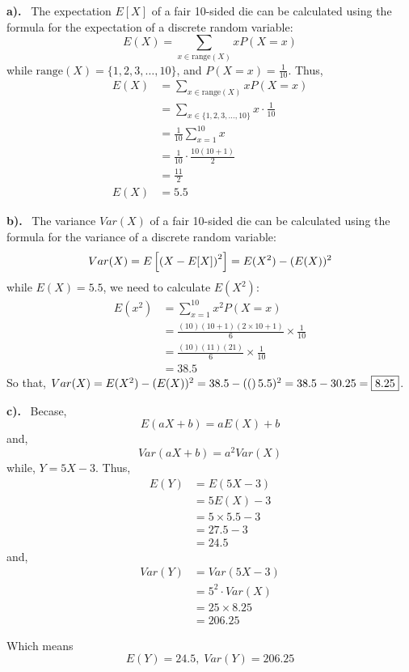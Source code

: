 \documentclass[a4paper, 10pt]{article}
\begin{document}
\begin{solution}
\par\noindent\textbf{a).} \, The expectation \( E[X] \) of a fair 10-sided die can be calculated
using the formula for the expectation of a discrete random variable:
\[
    E(X) = \sum_{x \in \text{range}(X)} x P(X = x)
\]
while \( \text{range}(X) = \{1, 2, 3, \dots, 10\} \), and \( P(X = x) = \frac{1}{10} \).
Thus,
\begin{align*}
    E(X) &= \sum_{x \in \text{range}(X)} x P(X = x) \\
    &= \sum_{x \in \{1, 2, 3, \dots, 10\}} x \cdot \frac{1}{10} \\
    &= \frac{1}{10} \sum_{x=1}^{10} x \\
    &= \frac{1}{10} \cdot \frac{10(10 + 1)}{2} \\
    &= \frac{11}{2} \\
    E(X) &= \boxed{5.5}
\end{align*}

\vspace{2mm}

\par\noindent\textbf{b).} \, The variance \( Var(X) \) of a fair 10-sided die can be calculated
using the formula for the variance of a discrete random variable:
\[
    Var(X) = E\left[\left(X - E[X]\right)^2\right] = E(X^2) - (E(X))^2
\]
while \( E(X) = 5.5 \), we need to calculate \( E(X^2) \):
\begin{align*}
    E(x^2) &= \sum_{x=1}^{10} x^2 P(X = x) \\
    &= \frac{(10)(10 + 1)(2 \times 10 + 1)}{6} \times \frac{1}{10} \\
    &= \frac{(10)(11)(21)}{6} \times \frac{1}{10} \\
    &= 38.5
\end{align*}
So that, \( Var(X) = E(X^2) - (E(X))^2 = 38.5 - \left((\right)5.5)^2 = 38.5 - 30.25 = \boxed{8.25} \).

\vspace{2mm}

\par\noindent\textbf{c).} \, Becase,
\[
    E(aX + b) = aE(X) + b
\]
and,
\[
    Var(aX + b) = a^2 Var(X)
\]
while, \( Y = 5X - 3 \). Thus,
\begin{align*}
    E(Y) &= E(5X - 3) \\
    &= 5E(X) - 3 \\
    &= 5 \times 5.5 - 3 \\
    &= 27.5 - 3 \\
    &= 24.5
\end{align*}
and,
\begin{align*}
    Var(Y) &= Var(5X - 3) \\
    &= 5^2 \cdot Var(X) \\
    &= 25 \times 8.25 \\
    &= 206.25
\end{align*}

Which means
\[\boxed{
    E(Y) = 24.5, \; Var(Y) = 206.25
}\]
\end{solution}
\end{document}
